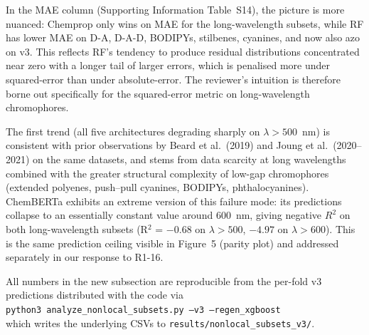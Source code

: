 \documentclass[11pt]{article}
\begin{document}
{In the MAE column (Supporting Information Table~S14), the picture is more nuanced: Chemprop only wins on MAE for the long-wavelength subsets, while RF has lower MAE on D-A, D-A-D, BODIPYs, stilbenes, cyanines, and now also azo on v3. This reflects RF's tendency to produce residual distributions concentrated near zero with a longer tail of larger errors, which is penalised more under squared-error than under absolute-error. The reviewer's intuition is therefore borne out specifically for the squared-error metric on long-wavelength chromophores.

The first trend (all five architectures degrading sharply on $\lambda > 500$~nm) is consistent with prior observations by Beard et al.\ (2019) and Joung et al.\ (2020--2021) on the same datasets, and stems from data scarcity at long wavelengths combined with the greater structural complexity of low-gap chromophores (extended polyenes, push--pull cyanines, BODIPYs, phthalocyanines). ChemBERTa exhibits an extreme version of this failure mode: its predictions collapse to an essentially constant value around 600~nm, giving negative $R^2$ on both long-wavelength subsets (R$^2$ = $-0.68$ on $\lambda > 500$, $-4.97$ on $\lambda > 600$). This is the same prediction ceiling visible in Figure~5 (parity plot) and addressed separately in our response to R1-16.

All numbers in the new subsection are reproducible from the per-fold v3 predictions distributed with the code via\\
\hspace*{1em}\texttt{python3 analyze\_nonlocal\_subsets.py --v3 --regen\_xgboost}\\
which writes the underlying CSVs to \texttt{results/nonlocal\_subsets\_v3/}.}
\end{document}
